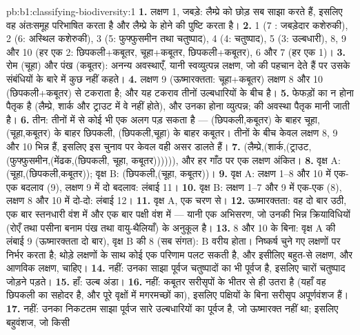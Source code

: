 \begin{solution}{pb:b1:classifying-biodiversity:1}
\textbf{1.} लक्षण 1, जबड़े: लैम्प्रे को छोड़ सब साझा करते हैं, इसलिए वह
अंतःसमूह परिभाषित करता है और लैम्प्रे के  होने की पुष्टि करता है।
\textbf{2.} 1 (7 : जबड़ेदार कशेरुकी), 2 (6: अस्थिल कशेरुकी), 3
(5: फुफ्फुसमीन तथा चतुष्पाद), 4 (4: चतुष्पाद), 5 (3: उल्बधारी), 8, 9
और 10 (हर एक 2: छिपकली+कबूतर, चूहा+कबूतर, छिपकली+कबूतर), 6 और 7
(हर एक 1)।
\textbf{3.} रोम (चूहा) और पंख (कबूतर): अनन्य अवस्थाएँ,
यानी स्वव्युत्पन्न लक्षण, जो  की पहचान देते हैं पर उसके संबंधियों
के बारे में कुछ नहीं कहते।
\textbf{4.} लक्षण 9 (ऊष्मारक्तता: चूहा+कबूतर) लक्षण 8
और 10 (छिपकली+कबूतर) से टकराता है; और यह टकराव तीनों उल्बधारियों के बीच है।
\textbf{5.} फेफड़ों का न होना पैतृक है (लैम्प्रे, शार्क और
ट्राउट में वे नहीं होते), और उनका होना व्युत्पन्न;  की अवस्था
पैतृक मानी जाती है।
\textbf{6.} तीन: तीनों में से कोई भी एक अलग पड़ सकता है ---
(छिपकली,कबूतर) के बाहर चूहा, (चूहा,कबूतर) के बाहर छिपकली,
(छिपकली,चूहा) के बाहर कबूतर। तीनों के बीच केवल लक्षण 8, 9
और 10 भिन्न हैं, इसलिए इस चुनाव पर केवल वही असर डालते हैं।
\textbf{7.} (लैम्प्रे,(शार्क,(ट्राउट,(फुफ्फुसमीन,(मेंढक,(छिपकली, चूहा,
कबूतर)))))), और हर गाँठ पर एक लक्षण अंकित।
\textbf{8.} वृक्ष A: (चूहा,(छिपकली,कबूतर)); वृक्ष B: (छिपकली,(चूहा,
कबूतर))।
\textbf{9.} वृक्ष A: लक्षण 1--8 और 10 में एक-एक बदलाव (9), लक्षण
9 में दो बदलाव: लंबाई \num{11}।
\textbf{10.} वृक्ष B: लक्षण 1--7 और 9 में एक-एक (8), लक्षण 8 और
10 में दो-दो: लंबाई \num{12}।
\textbf{11.} वृक्ष A, एक चरण से।
\textbf{12.} ऊष्मारक्तता: वह दो बार उठी, एक बार स्तनधारी वंश में और
एक बार पक्षी वंश में --- यानी एक अभिसरण, जो उनकी
भिन्न क्रियाविधियों (रोएँ तथा पसीना बनाम पंख तथा वायु-थैलियाँ) के अनुकूल है।
\textbf{13.} 8 और 10 के बिना: वृक्ष A की लंबाई 9 (ऊष्मारक्तता दो बार),
वृक्ष B की 8 (सब संगत): B वरीय होता। निष्कर्ष
चुने गए लक्षणों पर निर्भर करता है; थोड़े लक्षणों के साथ कोई एक
 परिणाम पलट सकती है, और इसीलिए बहुत-से लक्षण, और आणविक
लक्षण, चाहिए।
\textbf{14.} नहीं: उनका साझा पूर्वज चतुष्पादों का भी पूर्वज है,
इसलिए चारों चतुष्पाद जोड़ने पड़ते।
\textbf{15.} हाँ: उल्ब अंडा।
\textbf{16.} नहीं: कबूतर सरीसृपों के भीतर से ही उतरा है (यहाँ वह
छिपकली का सहोदर है, और पूरे वृक्षों में मगरमच्छों का), इसलिए
पक्षियों के बिना सरीसृप अपूर्णवंशज हैं।
\textbf{17.} नहीं: उनका निकटतम साझा पूर्वज सारे
उल्बधारियों का पूर्वज है, जो ऊष्मारक्त नहीं था; इसलिए बहुवंशज, जो किसी

\end{solution}
